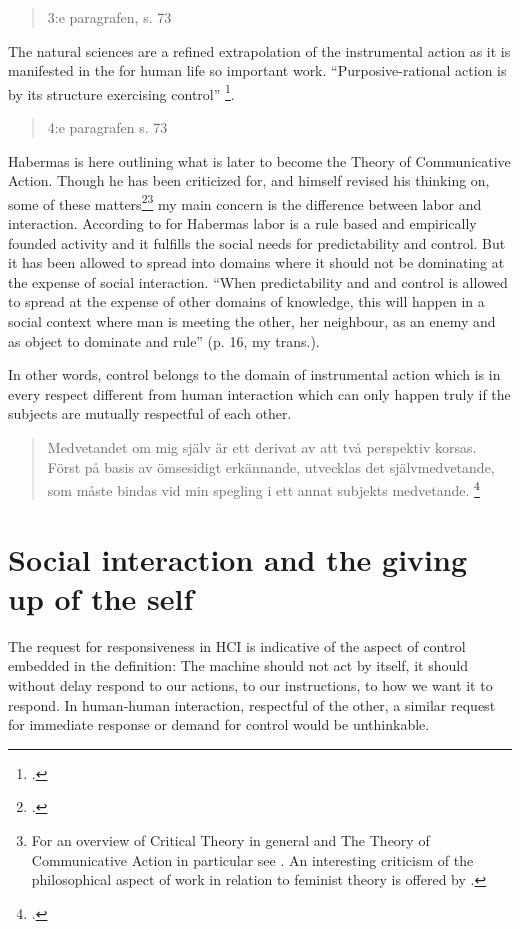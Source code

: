 \begin{quotation}
  3:e paragrafen, s. 73
\end{quotation}

The natural sciences are a refined extrapolation of the instrumental action as it is manifested in the for human life so important work. ``Purposive-rational action is by its structure exercising control'' \footcite[(\textit{My   translation})][63]{habermas68}. 

\begin{quotation}
  4:e paragrafen s. 73
\end{quotation}

Habermas is here outlining what is later to become the Theory of Communicative Action. Though he has been criticized for, and himself revised his thinking on, some of these matters\footcite[see]{bertilsson83}\footnote{For an overview of Critical Theory in general and The Theory of Communicative Action in particular see \cite{ericsson01}. An interesting criticism of the philosophical aspect of work in relation to feminist theory is offered by \cite{gurtler05}.} my main concern is the difference between labor and interaction. According to \citeauthor{bertilsson83} for Habermas labor is a rule based and empirically founded activity and it fulfills the social needs for predictability and control. But it has been allowed to spread into domains where it should not be dominating at the expense of social interaction. ``When predictability and and control is allowed to spread at the expense of other domains of knowledge, this will happen in a social context where man is meeting the other, her neighbour, as an enemy and as object to dominate and rule'' (p. 16, my trans.). 

In other words, control belongs to the domain of instrumental action which is in every respect different from human interaction which can only happen truly if the subjects are mutually respectful of each other. 
\begin{quotation}
  Medvetandet om mig själv är ett derivat av att två perspektiv   korsas. Först på basis av ömsesidigt erkännande, utvecklas det   självmedvetande, som måste bindas vid min spegling i ett annat   subjekts medvetande. \footcite[183]{habermas68} 
\end{quotation}

\section{Social interaction and the giving up of the self}
\label{sec:social-interaction}
 The request for responsiveness in HCI is indicative of the aspect of control embedded in the definition: The machine should not act by itself, it should without delay respond to our actions, to our instructions, to how we want it to respond. In human-human interaction, respectful of the other, a similar request for immediate response or demand for control would be unthinkable.

